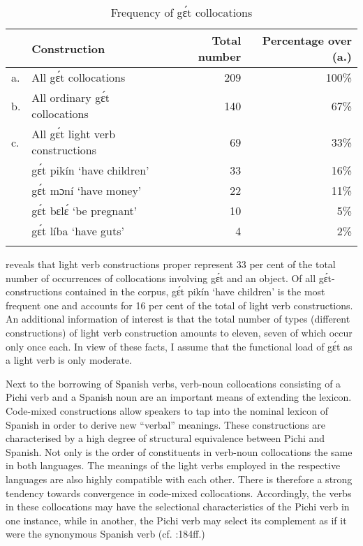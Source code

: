 \begin{table}
\caption{Frequency of gɛ́t collocations}
\label{tab:key:9.8}

\begin{tabularx}{\textwidth}{lXrr}
\lsptoprule
& Construction & Total number & Percentage over (a.)\\
\midrule
a. & All gɛ́t collocations & 209 & 100\%\\
\tablevspace 
b. & All ordinary gɛ́t collocations & 140 & 67\%\\
\tablevspace
c. & All gɛ́t light verb constructions & 69 & 33\%\\
   & gɛ́t pikín   ‘have children’ & 33 & 16\%\\
   & gɛ́t mɔní  ‘have money’ & 22 & 11\%\\
   & gɛ́t bɛlɛ́  ‘be pregnant’ & 10 & 5\%\\
   & gɛ́t líba   ‘have guts’ & 4 & 2\%\\
\lspbottomrule
\end{tabularx}
\end{table}
 reveals that light verb constructions proper represent 33 per cent of the total number of occurrences of collocations involving gɛ́t and an object. Of all gɛ́t-constructions contained in the corpus, gɛ́t pikín ‘have children’ is the most frequent one and accounts for 16 per cent of the total of light verb constructions. An additional information of interest is that the total number of types (different constructions) of light verb construction amounts to eleven, seven of which occur only once each. In view of these facts, I assume that the functional load of gɛ́t as a light verb is only moderate.


Next to the borrowing of Spanish verbs, verb-noun collocations consisting of a Pichi verb and a Spanish noun are an important means of extending the lexicon. Code-mixed constructions allow speakers to tap into the nominal lexicon of Spanish in order to derive new “verbal” meanings. These constructions are characterised by a high degree of structural equivalence between Pichi and Spanish. Not only is the order of constituents in verb-noun collocations the same in both languages. The meanings of the light verbs employed in the respective languages are also highly compatible with each other. There is therefore a strong tendency towards convergence in code-mixed collocations. Accordingly, the verbs in these collocations may have the selectional characteristics of the Pichi verb in one instance, while in another, the Pichi verb may select its complement as if it were the synonymous Spanish verb (cf. \citealt{Muysken2000}:184ff.)



